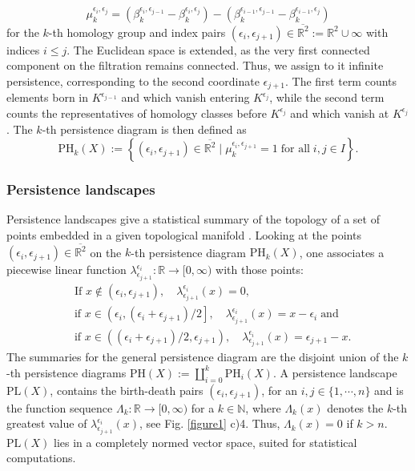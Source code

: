 \documentclass[runningheads,orivec]{llncs}
\begin{document}
\begin{equation}
\mu^{\epsilon_{i},\epsilon_{j}}_k = (\beta_k^{\epsilon_{i},\epsilon_{j-1}} - \beta_k^{\epsilon_i,\epsilon_{j}})-(\beta_k^{\epsilon_{i-1},\epsilon_{j-1}}-\beta_k^{\epsilon_{i-1},\epsilon_{j}})
\end{equation}
for the $k$-th homology group and index pairs $(\epsilon_i,\epsilon_{j+1}) \in \overline{\mathbb{R}^2} := \mathbb{R}^2 \cup \infty$ with indices $i \leq j$. The Euclidean space is extended, as the very first connected component on the filtration remains connected. Thus, we assign to it infinite persistence, corresponding to the second coordinate $\epsilon_{j+1}$. The first term counts elements born in $K^{\epsilon_{j-1}}$ and which vanish entering $K^{\epsilon_{j}}$, while the second term counts the representatives of homology classes before $K^{\epsilon_{j}}$ and which vanish at $K^{\epsilon_{j}}$. The $k$-th persistence diagram is then defined as
\begin{equation}
\text{PH}_{k}(X) := \left\{(\epsilon_i, \epsilon_{j+1}) \in \overline{\mathbb{R}^2} \; \bigg\vert \; \mu^{\epsilon_{i},\epsilon_{j+1}}_k = 1 \; \text{for all} \; i,j \in I \right\}.
\end{equation}

\subsubsection{Persistence landscapes} Persistence landscapes give a statistical summary of the topology of a set of points embedded in a given topological manifold \cite{bubenik2015statistical,bubenikD17}. Looking at the points $(\epsilon_i,\epsilon_{j+1}) \in \overline{\mathbb{R}^2}$ on the $k$-th persistence diagram $\text{PH}_{k}(X)$, one associates a piecewise linear function $\lambda^{\epsilon_i}_{\epsilon_{j+1}}: \mathbb{R} \rightarrow [0,\infty)$ with those points:
\begin{align}
    &\text{If } x \not\in (\epsilon_i,\epsilon_{j+1}), \quad \lambda^{\epsilon_i}_{\epsilon_{j+1}}(x) = 0,\\
    &\text{if } x \in \left(\epsilon_{i},(\epsilon_i + \epsilon_{j+1})/2 \right], \quad \lambda^{\epsilon_i}_{\epsilon_{j+1}}(x) = x - \epsilon_{i} \; \text{and}\\
    &\text{if } x \in \left((\epsilon_i + \epsilon_{j+1})/2,\epsilon_{j+1} \right), \quad \lambda^{\epsilon_i}_{\epsilon_{j+1}}(x) = \epsilon_{j+1} - x.
\end{align}
The summaries for the general persistence diagram are the disjoint union of the $k$-th persistence diagrams $\text{PH}(X) := \coprod_{i=0}^{k} \text{PH}_i(X)$. A persistence landscape $\text{PL}(X)$, contains the birth-death pairs $(\epsilon_i,\epsilon_{j+1})$, for an $i,j \in \{1, \cdots, n\}$ and is the function sequence $\Lambda_k : \mathbb{R} \rightarrow [0,\infty)$ for a $k \in \mathbb{N}$, where $\Lambda_k(x)$ denotes the $k$-th greatest value of $\lambda^{\epsilon_i}_{\epsilon_{j+1}}(x)$, see Fig. \ref{figure1} c)4. Thus, $\Lambda_k(x) = 0$ if $k > n$. $\text{PL}(X)$ lies in a completely normed vector space, suited for statistical computations.
\end{document}
